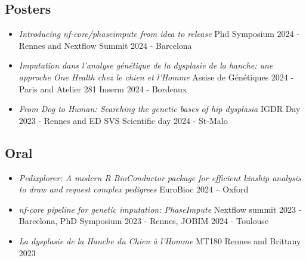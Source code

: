 \documentclass[11pt,a4paper]{moderncv}
\begin{document}
    \subsection{Posters}
        \begin{itemize}
            \item \textit{Introducing nf-core/phaseimpute from idea to release} \newline
            Phd Symposium 2024 - Rennes and Nextflow Summit 2024 - Barcelona \\
            \item \textit{Imputation dans l'analyse génétique de la dysplasie de la hanche: une approche One Health chez le chien et l’Homme} \newline
            Assise de Génétiques 2024 - Paris and Atelier 281 Inserm 2024 - Bordeaux \\
            \item \textit{From Dog to Human: Searching the genetic bases of hip dysplasia} \newline
            IGDR Day 2023 - Rennes and ED SVS Scientific day 2024 - St-Malo \\
        \end{itemize}

    \subsection{Oral}
        \begin{itemize}
            \item \textit{Pedixplorer: A modern R BioConductor package for efficient kinship analysis to draw and request complex pedigrees} \newline
            EuroBioc 2024 – Oxford \\
            \item \textit{nf-core pipeline for genetic imputation: PhaseImpute} \newline
            Nextflow summit 2023 - Barcelona, PhD Symposium 2023 - Rennes, JOBIM 2024 - Toulouse \\
            \item \textit{La dysplasie de la Hanche du Chien à l’Homme} \newline
            MT180 Rennes and Brittany 2023 \\
        \end{itemize}
\end{document}
